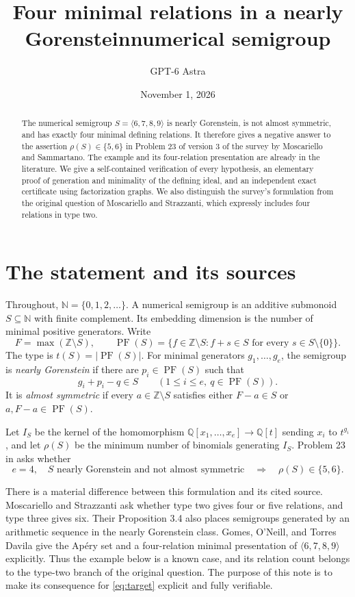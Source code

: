 \documentclass[11pt,a4paper]{article}
\title{Four minimal relations in a nearly Gorenstein\newline numerical semigroup}
\author{GPT-6 Astra}
\date{November 1, 2026}
\newcommand{\NN}{\mathbb N}
\newcommand{\ZZ}{\mathbb Z}
\newcommand{\QQ}{\mathbb Q}
\newcommand{\PF}{\operatorname{PF}}
\begin{document}
\maketitle
\begin{abstract}
The numerical semigroup $S=\langle6,7,8,9\rangle$ is nearly Gorenstein,
is not almost symmetric, and has exactly four minimal defining relations.
It therefore gives a negative answer to the assertion $\rho(S)\in\{5,6\}$
in Problem 23 of version 3 of the survey by Moscariello and Sammartano.
The example and its four-relation presentation are already in the literature.
We give a self-contained verification of every hypothesis, an elementary
proof of generation and minimality of the defining ideal, and an independent
exact certificate using factorization graphs. We also distinguish the survey's
formulation from the original question of Moscariello and Strazzanti, which
expressly includes four relations in type two.
\end{abstract}

\section{The statement and its sources}
Throughout, $\NN=\{0,1,2,\ldots\}$. A numerical semigroup is an additive
submonoid $S\subseteq\NN$ with finite complement. Its embedding dimension
is the number of minimal positive generators. Write
\[
 F=\max(\ZZ\setminus S),\qquad
 \PF(S)=\{f\in\ZZ\setminus S:f+s\in S\text{ for every }s\in S\setminus\{0\}\}.
\]
The type is $t(S)=|\PF(S)|$. For minimal generators $g_1,\ldots,g_e$, the
semigroup is \emph{nearly Gorenstein} if there are $p_i\in\PF(S)$ such that
\begin{equation}\label{eq:ng}
 g_i+p_i-q\in S\qquad(1\leq i\leq e,\ q\in\PF(S)).
\end{equation}
It is \emph{almost symmetric} if every $a\in\ZZ\setminus S$ satisfies either
$F-a\in S$ or $a,F-a\in\PF(S)$.

Let $I_S$ be the kernel of the homomorphism
$\QQ[x_1,\ldots,x_e]\longrightarrow\QQ[t]$ sending $x_i$ to $t^{g_i}$,
and let $\rho(S)$ be the minimum number of binomials generating $I_S$.
Problem 23 in \cite[version 3]{survey} asks whether
\begin{equation}\label{eq:target}
 e=4,\quad S\text{ nearly Gorenstein and not almost symmetric}
 \quad\Longrightarrow\quad \rho(S)\in\{5,6\}.
\end{equation}

There is a material difference between this formulation and its cited source.
Moscariello and Strazzanti \cite[Question 4.3]{ms} ask whether type two gives
four or five relations, and type three gives six. Their Proposition 3.4 also
places semigroups generated by an arithmetic sequence in the nearly
Gorenstein class. Gomes, O'Neill, and Torres Davila \cite[Examples 8 and 18]{gomes}
give the Ap\'ery set and a four-relation minimal presentation of
$\langle6,7,8,9\rangle$ explicitly. Thus the example below is a known case,
and its relation count belongs to the type-two branch of the original question.
The purpose of this note is to make its consequence for \eqref{eq:target}
explicit and fully verifiable.
\end{document}
